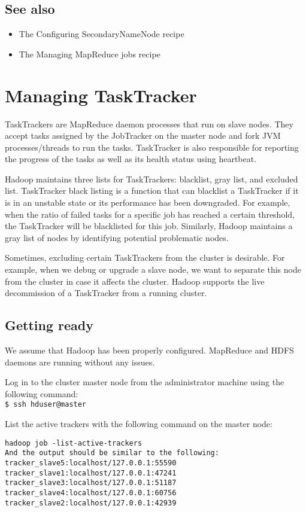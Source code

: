 \subsection*{See also}
\begin{itemize}
\item The Configuring SecondaryNameNode recipe
\item The Managing MapReduce jobs recipe
\end{itemize} 

\section{Managing TaskTracker}
TaskTrackers are MapReduce daemon processes that run on slave nodes. They accept tasks assigned by the JobTracker on the master node and fork JVM processes/threads to run the tasks. TaskTracker is also responsible for reporting the progress of the tasks as well as its health status using heartbeat.

Hadoop maintains three lists for TaskTrackers: blacklist, gray list, and excluded list. TaskTracker black listing is a function that can blacklist a TaskTracker if it is in an unstable state or its performance has been downgraded. For example, when the ratio of failed tasks for a specific job has reached a certain threshold, the TaskTracker will be blacklisted for this job. Similarly, Hadoop maintains a gray list of nodes by identifying potential problematic nodes.

Sometimes, excluding certain TaskTrackers from the cluster is desirable. For example, when we debug or upgrade a slave node, we want to separate this node from the cluster in case it affects the cluster. Hadoop supports the live decommission of a TaskTracker from a running cluster.

\subsection*{Getting ready}
We assume that Hadoop has been properly configured. MapReduce and HDFS daemons are running without any issues.

Log in to the cluster master node from the administrator machine using the following command: \\
\verb|$ ssh hduser@master|

List the active trackers with the following command on the master node:
\begin{verbatim} 
hadoop job -list-active-trackers
And the output should be similar to the following:
tracker_slave5:localhost/127.0.0.1:55590
tracker_slave1:localhost/127.0.0.1:47241
tracker_slave3:localhost/127.0.0.1:51187
tracker_slave4:localhost/127.0.0.1:60756
tracker_slave2:localhost/127.0.0.1:42939
\end{verbatim}

